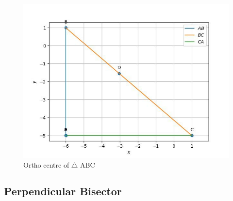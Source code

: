 \documentclass[11pt]{book}
\begin{document}
\begin{figure}[H]
    \centering
    \includegraphics{figs/orthocentre.png}
    \caption{Ortho centre of $\triangle$ ABC}
    \label{fig:mat_alt1}
\end{figure}


\subsection{Perpendicular Bisector}
\end{document}
